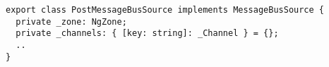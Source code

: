 \begin{verbatim}
export class PostMessageBusSource implements MessageBusSource {
  private _zone: NgZone;
  private _channels: { [key: string]: _Channel } = {};
  ..
}
\end{verbatim}
